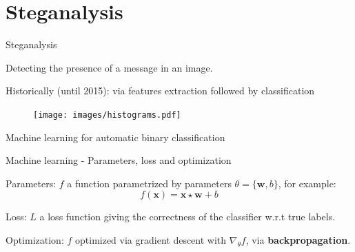 \documentclass[10pt]{beamer}
\newcommand{\grad}{\nabla}
\begin{document}


\section{Steganalysis}


\begin{frame}{Steganalysis}


\begin{center}
    \alert{Detecting the presence of a message in an image.}
\end{center}

\pause

Historically (until 2015): via features extraction followed by classification

\begin{figure}
        \texttt{[image: images/histograms.pdf]}
\end{figure}

\end{frame}

\begin{frame}{Machine learning for automatic binary classification}
\end{frame}

\begin{frame}{Machine learning - Parameters, loss and optimization}


\alert{Parameters}: $f$ a function parametrized by parameters $\theta = \{\mathbf{w}, b \}$, for example:
\begin{equation}
    f(\mathbf{x}) = \mathbf{x} \star \mathbf{w} + b
\end{equation}

\pause

\alert{Loss}: $L$ a loss function giving the correctness of the classifier w.r.t true labels.

\pause

\alert{Optimization}: $f$ optimized via gradient descent with $\grad_\theta f$, via \textbf{backpropagation}.
    
\end{frame}
\end{document}
